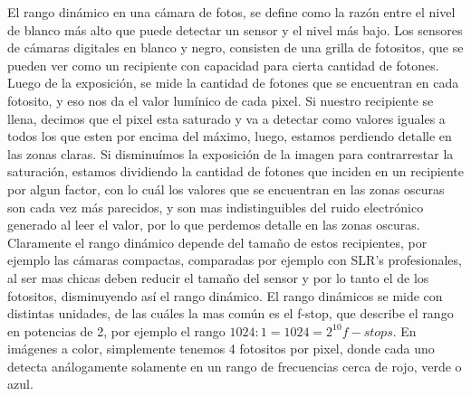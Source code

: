 \documentclass[a4paper,10pt]{article}
\begin{document}
        El rango dinámico en una cámara de fotos, se define como la razón entre el nivel de blanco más alto que puede detectar un sensor y el nivel más bajo. Los sensores de cámaras digitales en blanco y negro, consisten de una grilla de fotositos, que se pueden ver como un recipiente con capacidad para cierta cantidad de fotones. Luego de la exposición, se mide la cantidad de fotones que se encuentran en cada fotosito, y eso nos da el valor lumínico de cada pixel. Si nuestro recipiente se llena, decimos que el pixel esta saturado y va a detectar como valores iguales a todos los que esten por encima del máximo, luego, estamos perdiendo detalle en las zonas claras. Si disminuímos la exposición de la imagen para contrarrestar la saturación, estamos dividiendo la cantidad de fotones que inciden en un recipiente por algun factor, con lo cuál los valores que se encuentran en las zonas oscuras son cada vez más parecidos, y son mas indistinguibles del ruido electrónico generado al leer el valor, por lo que perdemos detalle en las zonas oscuras. Claramente el rango dinámico depende del tamaño de estos recipientes, por ejemplo las cámaras compactas, comparadas por ejemplo con SLR's profesionales, al ser mas chicas deben reducir el tamaño del sensor y por lo tanto el de los fotositos, disminuyendo así el rango dinámico. El rango dinámicos se mide con distintas unidades, de las cuáles la mas común es el f-stop, que describe el rango en potencias de 2, por ejemplo el rango $1024:1 = 1024 = 2^{10} f-stops$.
        En imágenes a color, simplemente tenemos 4 fotositos por pixel, donde cada uno detecta análogamente solamente en un rango de frecuencias cerca de rojo, verde o azul. 

    
    
\end{document}
